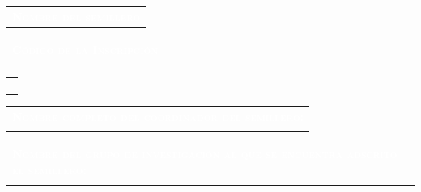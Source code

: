 \documentclass[12pt]{report}
\newcommand\wcolorC{mycolorC}
\begin{document}
{%
\noindent
\begin{minipage}{\textwidth}
	\begin{tabular}{l}
		\begin{minipage}[t]{0.65\textwidth}%
			\cellcolor{\wcolorC}\textcolor{white}{\textsc{\textbf{Nombre del semillero}}}
		\end{minipage}
	\end{tabular}	
	\begin{tabular}{l}
		\begin{minipage}[t]{0.325\textwidth}%
			\centering
			\cellcolor{\wcolorC}\textcolor{white}{\textsc{\textbf{Código de la Inscripción}}}
		\end{minipage}
	\end{tabular}	
\end{minipage}
\noindent
\begin{minipage}{\textwidth}
	\begin{tabular}{l}
		\begin{minipage}[t]{0.65\textwidth}%
			\hotbed
		\end{minipage}
	\end{tabular}	
	\begin{tabular}{c}
		\begin{minipage}[t]{0.325\textwidth}
			\centering
			\textbf{\code}
		\end{minipage}
	\end{tabular}	
\end{minipage}
\noindent
\begin{minipage}{\textwidth}
	\begin{tabular}{l}
		\begin{minipage}[t]{\textwidth}%
			\cellcolor{\wcolorC}\textcolor{white}{\textsc{\textbf{Nombre completo del coordinador del semillero:}}}
		\end{minipage}
		\vspace{0.1cm}\\
		\begin{minipage}[t]{\textwidth}%
			\leader
		\end{minipage}
	\end{tabular}	
\end{minipage}
\noindent
\begin{minipage}{\textwidth}
	\begin{tabular}{l}
		\begin{minipage}[t]{\textwidth}%
			\cellcolor{\wcolorC}\textcolor{white}{\textsc{\textbf{Nombre del grupo de investigación al que se encuentra adscrito el semillero:}}}
		\end{minipage}
		\vspace{0.1cm}\\
		\begin{minipage}[t]{\textwidth}%
			\resgroup
		\end{minipage}
	\end{tabular}	
\end{minipage}
}
\end{document}
